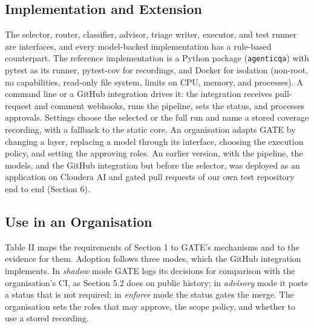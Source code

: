 \documentclass[conference]{IEEEtran}
\begin{document}
\subsection{Implementation and Extension}\label{implementation-and-extension}

The selector, router, classifier, advisor, triage writer, executor, and test runner are interfaces, and every model-backed implementation has a rule-based counterpart. The reference implementation is a Python package (\texttt{agenticqa}) with pytest as its runner, pytest-cov for recordings, and Docker for isolation (non-root, no capabilities, read-only file system, limits on CPU, memory, and processes). A command line or a GitHub integration drives it: the integration receives pull-request and comment webhooks, runs the pipeline, sets the status, and processes approvals. Settings choose the selected or the full run and name a stored coverage recording, with a fallback to the static core. An organisation adapts GATE by changing a layer, replacing a model through its interface, choosing the execution policy, and setting the approving roles. An earlier version, with the pipeline, the models, and the GitHub integration but before the selector, was deployed as an application on Cloudera AI and gated pull requests of our own test repository end to end (Section 6).

\subsection{Use in an Organisation}\label{use-in-an-organisation}

Table II maps the requirements of Section 1 to GATE's mechanisms and to the evidence for them. Adoption follows three modes, which the GitHub integration implements. In \emph{shadow} mode GATE logs its decisions for comparison with the organisation's CI, as Section 5.2 does on public history; in \emph{advisory} mode it posts a status that is not required; in \emph{enforce} mode the status gates the merge. The organisation sets the roles that may approve, the scope policy, and whether to use a stored recording.
\end{document}
